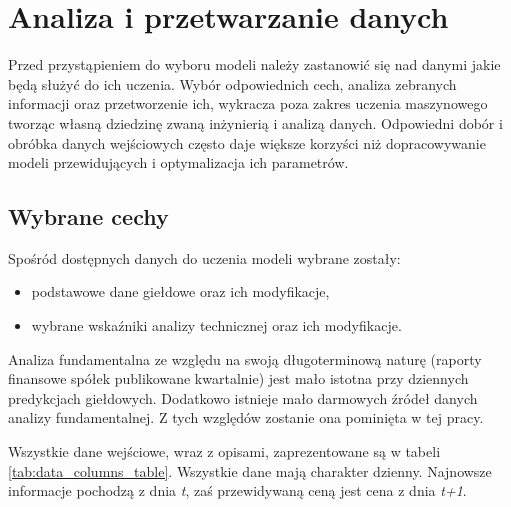 \documentclass[a4paper, twoside, 11pt, openright]{article}
\begin{document}
\newpage

\section{Analiza i przetwarzanie danych}

Przed przystąpieniem do wyboru modeli należy zastanowić się nad danymi jakie będą służyć do ich uczenia. Wybór odpowiednich cech, analiza zebranych informacji oraz przetworzenie ich, wykracza poza zakres uczenia maszynowego tworząc własną dziedzinę zwaną inżynierią i analizą danych. Odpowiedni dobór i obróbka danych wejściowych często daje większe korzyści niż dopracowywanie modeli przewidujących i optymalizacja ich parametrów. 

\subsection{Wybrane cechy}

Spośród dostępnych danych do uczenia modeli wybrane zostały: 
\begin{itemize}
\item podstawowe dane giełdowe oraz ich modyfikacje,
\item wybrane wskaźniki analizy technicznej oraz ich modyfikacje.
\end{itemize}

Analiza fundamentalna ze względu na swoją długoterminową naturę (raporty finansowe spółek publikowane kwartalnie) jest mało istotna przy dziennych predykcjach giełdowych. Dodatkowo istnieje mało darmowych źródeł danych analizy fundamentalnej. Z tych względów zostanie ona pominięta w tej pracy.

\bigskip

Wszystkie dane wejściowe, wraz z opisami, zaprezentowane są w tabeli \ref{tab:data_columns_table}. Wszystkie dane mają charakter dzienny. Najnowsze informacje pochodzą z dnia \textit{t}, zaś przewidywaną ceną jest cena z dnia \textit{t+1}.
\end{document}
